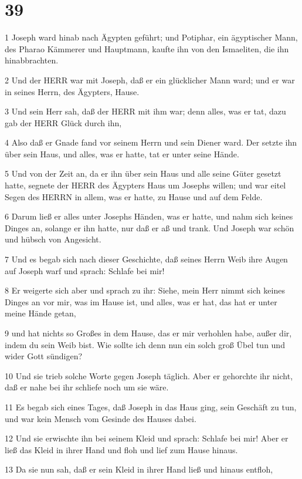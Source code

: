 \chapter{39}

\par 1 Joseph ward hinab nach Ägypten geführt; und Potiphar, ein ägyptischer Mann, des Pharao Kämmerer und Hauptmann, kaufte ihn von den Ismaeliten, die ihn hinabbrachten.
\par 2 Und der HERR war mit Joseph, daß er ein glücklicher Mann ward; und er war in seines Herrn, des Ägypters, Hause.
\par 3 Und sein Herr sah, daß der HERR mit ihm war; denn alles, was er tat, dazu gab der HERR Glück durch ihn,
\par 4 Also daß er Gnade fand vor seinem Herrn und sein Diener ward. Der setzte ihn über sein Haus, und alles, was er hatte, tat er unter seine Hände.
\par 5 Und von der Zeit an, da er ihn über sein Haus und alle seine Güter gesetzt hatte, segnete der HERR des Ägypters Haus um Josephs willen; und war eitel Segen des HERRN in allem, was er hatte, zu Hause und auf dem Felde.
\par 6 Darum ließ er alles unter Josephs Händen, was er hatte, und nahm sich keines Dinges an, solange er ihn hatte, nur daß er aß und trank. Und Joseph war schön und hübsch von Angesicht.
\par 7 Und es begab sich nach dieser Geschichte, daß seines Herrn Weib ihre Augen auf Joseph warf und sprach: Schlafe bei mir!
\par 8 Er weigerte sich aber und sprach zu ihr: Siehe, mein Herr nimmt sich keines Dinges an vor mir, was im Hause ist, und alles, was er hat, das hat er unter meine Hände getan,
\par 9 und hat nichts so Großes in dem Hause, das er mir verhohlen habe, außer dir, indem du sein Weib bist. Wie sollte ich denn nun ein solch groß Übel tun und wider Gott sündigen?
\par 10 Und sie trieb solche Worte gegen Joseph täglich. Aber er gehorchte ihr nicht, daß er nahe bei ihr schliefe noch um sie wäre.
\par 11 Es begab sich eines Tages, daß Joseph in das Haus ging, sein Geschäft zu tun, und war kein Mensch vom Gesinde des Hauses dabei.
\par 12 Und sie erwischte ihn bei seinem Kleid und sprach: Schlafe bei mir! Aber er ließ das Kleid in ihrer Hand und floh und lief zum Hause hinaus.
\par 13 Da sie nun sah, daß er sein Kleid in ihrer Hand ließ und hinaus entfloh,
